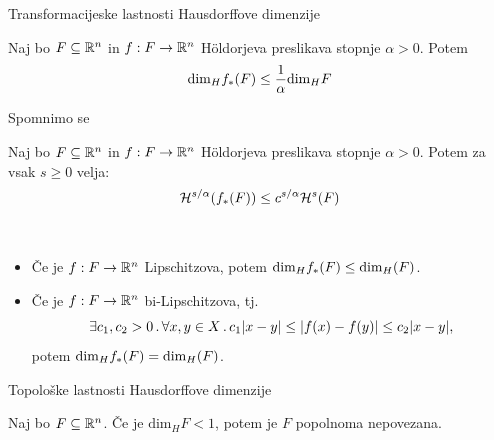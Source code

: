 \documentclass[10pt]{beamer}
\begin{document}
\begin{frame}[t]{Transformacijeske lastnosti Hausdorffove dimenzije}
    \begin{trditev}
        Naj bo \(F \subseteq \mathbb{R}^n\) in \(f: F \to \mathbb{R}^n\) Höldorjeva preslikava stopnje \(\alpha > 0\). Potem 
        \[\text{dim}_H f_{*}(F) \leq \frac{1}{\alpha} \text{dim}_H F\]        
    \end{trditev}
    \pause
     {
        Spomnimo se
        \begin{trditev}
            Naj bo \(F \subseteq \mathbb{R}^n\) in \(f: F \to \mathbb{R}^n\) Höldorjeva preslikava stopnje \(\alpha > 0\). Potem za vsak \(s \geq 0\) velja:
            \[\mathcal{H}^{s/\alpha}(f_{*}(F)) \leq c^{s/\alpha} \mathcal{H}^s(F)\]
        \end{trditev}
    }
    \pause
    \begin{posledica}
        \ 
        \begin{itemize}
            \item Če je \(f: F \to \mathbb{R}^n\) Lipschitzova, potem \(\text{dim}_H f_{*}(F) \leq \text{dim}_H(F)\).
            \pause
            \item Če je \(f: F \to \mathbb{R}^n\) bi-Lipschitzova, tj.
            \[\exists c_1, c_2 > 0 \,.\, \forall x, y \in X \,.\, c_1 |x- y| \leq |f(x) - f(y)| \leq c_2 |x - y|,\] 
            potem \(\text{dim}_H f_{*}(F) = \text{dim}_H(F)\).
        \end{itemize}
    \end{posledica}
\end{frame}


\begin{frame}[t]{Topološke lastnosti Hausdorffove dimenzije}
    \begin{trditev}
        Naj bo \(F \subseteq \mathbb{R}^n\). Če je \(\text{dim}_H F < 1\), potem je \(F\) \only<1>{...}\pause popolnoma nepovezana.
    \end{trditev}
\end{frame}
\end{document}
